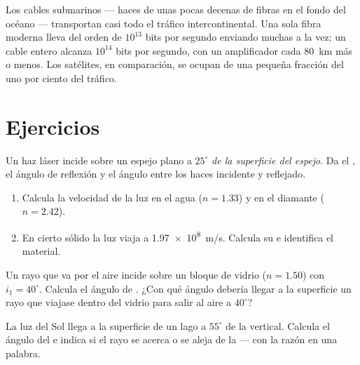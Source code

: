 \begin{remark}\label{rem:g10:refraction:datarates}
Los cables submarinos --- haces de unas pocas decenas de fibras en el
fondo del océano --- transportan casi todo el tráfico intercontinental.
Una sola fibra moderna lleva del orden de $10^{13}$ bits por segundo
enviando muchas  a la vez; un cable entero alcanza
$10^{14}$ bits por segundo, con un amplificador cada \qty{80}{km} más o
menos. Los satélites, en comparación, se ocupan de una pequeña fracción
del uno por ciento del tráfico.
\end{remark}

\section{Ejercicios}

\begin{exercise}[$\star$]\label{exo:g10:refraction:1}
Un haz láser incide sobre un espejo plano a $25^\circ$ \emph{de la
superficie del espejo}. Da el , el ángulo de
reflexión y el ángulo entre los haces incidente y reflejado.
\end{exercise}

\begin{exercise}[$\star$]\label{exo:g10:refraction:2}
\begin{enumerate}
  \item Calcula la velocidad de la luz en el agua ($n = 1.33$) y en el
        diamante ($n = 2.42$).
  \item En cierto sólido la luz viaja a \qty{1.97e8}{m/s}. Calcula su
         e identifica el material.
\end{enumerate}
\end{exercise}

\begin{exercise}[$\star$]\label{exo:g10:refraction:3}
Un rayo que va por el aire incide sobre un bloque de vidrio
($n = 1.50$) con $i_1 = 40^\circ$. Calcula el ángulo de . ¿Con
qué ángulo debería llegar a la superficie un rayo que viajase dentro del
vidrio para salir al aire a $40^\circ$?
\end{exercise}

\begin{exercise}[$\star$]\label{exo:g10:refraction:4}
La luz del Sol llega a la superficie de un lago a $55^\circ$ de la
vertical. Calcula el ángulo del  e indica si el rayo se
acerca o se aleja de la  --- con la razón en una palabra.
\end{exercise}

